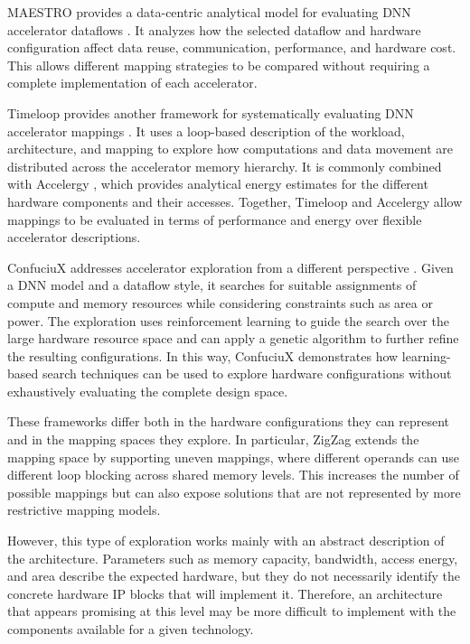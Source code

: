 MAESTRO provides a data-centric analytical model for evaluating DNN
accelerator dataflows \cite{maestro}. It analyzes how the selected
dataflow and hardware configuration affect data reuse, communication,
performance, and hardware cost. This allows different mapping
strategies to be compared without requiring a complete implementation
of each accelerator.

Timeloop provides another framework for systematically evaluating DNN
accelerator mappings \cite{timeloop}. It uses a loop-based description
of the workload, architecture, and mapping to explore how computations
and data movement are distributed across the accelerator memory
hierarchy. It is commonly combined with Accelergy
\cite{accelergy}, which provides analytical energy estimates for the
different hardware components and their accesses. Together,
Timeloop and Accelergy allow mappings to be evaluated in terms of
performance and energy over flexible accelerator descriptions.

ConfuciuX addresses accelerator exploration from a different
perspective \cite{confuciux}. Given a DNN model and a dataflow style,
it searches for suitable assignments of compute and memory resources
while considering constraints such as area or power. The exploration
uses reinforcement learning to guide the search over the large
hardware resource space and can apply a genetic algorithm to further
refine the resulting configurations. In this way, ConfuciuX
demonstrates how learning-based search techniques can be used to
explore hardware configurations without exhaustively evaluating the
complete design space.

These frameworks differ both in the hardware configurations they can
represent and in the mapping spaces they explore. In particular,
ZigZag extends the mapping space by supporting uneven mappings, where
different operands can use different loop blocking across shared
memory levels. This increases the number of possible mappings but can
also expose solutions that are not represented by more restrictive
mapping models.

However, this type of exploration works mainly with an abstract
description of the architecture. Parameters such as memory capacity,
bandwidth, access energy, and area describe the expected hardware, but
they do not necessarily identify the concrete hardware IP blocks that
will implement it. Therefore, an architecture that appears promising
at this level may be more difficult to implement with the components
available for a given technology.

